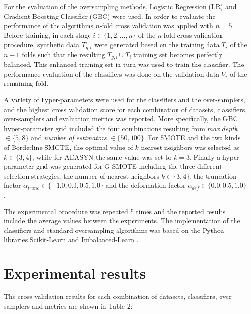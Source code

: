 \documentclass[parskip=full]{scrartcl}
\begin{document}
For the evaluation of the oversampling methods, Logistic Regression (LR) \cite{McCullagh1989} and Gradient Boosting Classifier (GBC) \cite{Friedman2001} were used. In order to evaluate the performance of the algorithms \( n \)-fold cross validation was applied with \( n = 5 \). Before training, in each stage \(i \in \{1, 2 ,... , n \} \) of the \( n \)-fold cross validation procedure, synthetic data \( T_{g, i} \) were generated based on the training data \(T_{i} \) of the \( n - 1 \) folds such that the resulting \(T_{g, i} \cup T_{i} \) training set becomes perfectly balanced. This enhanced training set in turn was used to train the classifier. The performance evaluation of the classifiers was done on the validation data \( V_{i} \) of the remaining fold. 

A variety of hyper-parameters were used for the classifiers and the over-samplers, and the highest cross validation score for each combination of datasets, classifiers, over-samplers and evaluation metrics was reported. More specifically, the GBC hyper-parameter grid included the four combinations resulting from  \textit{max depth} \( \in \{ 5 , 8 \} \) and \textit{number of estimators} \( \in \{50, 100\} \). For SMOTE and the two kinds of Borderline SMOTE, the optimal value of \( k \) nearest neighbors was selected as \( k \in \{ 3, 4 \} \), while for ADASYN the same value was set to \( k = 3 \). Finally a hyper-parameter grid was generated for G-SMOTE including the three different selection strategies, the number of nearest neighbors \(k \in \{ 3, 4 \} \), the truncation factor \( \alpha_{trunc} \in \{ -1.0, 0.0, 0.5, 1.0 \} \) and the deformation factor \( \alpha_{def} \in \{ 0.0, 0.5, 1.0 \} \).

The experimental procedure was repeated 5 times and the reported results include the average values between the experiments. The implementation of the classifiers and standard oversampling algorithms was based on the Python libraries Scikit-Learn \cite{Pedregosa2011} and Imbalanced-Learn \cite{Lemaitre2016}.

\section{Experimental results}

The cross validation results for each combination of datasets, classifiers, over-samplers and metrics are shown in Table 2:

\end{document}
